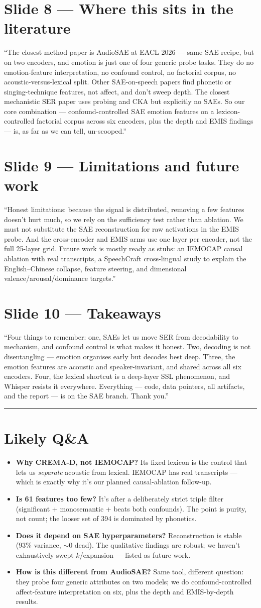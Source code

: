 \documentclass[11pt]{article}
\newcommand{\slide}[1]{\section{#1}}
\begin{document}
\slide{Slide 8 --- Where this sits in the literature}
``The closest method paper is AudioSAE at EACL 2026 --- same SAE recipe, but on two encoders, and emotion is just one of four generic probe tasks. They do no emotion-feature interpretation, no confound control, no factorial corpus, no acoustic-versus-lexical split. Other SAE-on-speech papers find phonetic or singing-technique features, not affect, and don't sweep depth. The closest mechanistic SER paper uses probing and CKA but explicitly no SAEs. So our core combination --- confound-controlled SAE emotion features on a lexicon-controlled factorial corpus across six encoders, plus the depth and EMIS findings --- is, as far as we can tell, un-scooped.''

\slide{Slide 9 --- Limitations and future work}
``Honest limitations: because the signal is distributed, removing a few features doesn't hurt much, so we rely on the sufficiency test rather than ablation. We must not substitute the SAE reconstruction for raw activations in the EMIS probe. And the cross-encoder and EMIS arms use one layer per encoder, not the full 25-layer grid. Future work is mostly ready as stubs: an IEMOCAP causal ablation with real transcripts, a SpeechCraft cross-lingual study to explain the English--Chinese collapse, feature steering, and dimensional valence/arousal/dominance targets.''

\slide{Slide 10 --- Takeaways}
``Four things to remember: one, SAEs let us move SER from decodability to mechanism, and confound control is what makes it honest. Two, decoding is not disentangling --- emotion organises early but decodes best deep. Three, the emotion features are acoustic and speaker-invariant, and shared across all six encoders. Four, the lexical shortcut is a deep-layer SSL phenomenon, and Whisper resists it everywhere. Everything --- code, data pointers, all artifacts, and the report --- is on the SAE branch. Thank you.''

\vspace{6pt}\hrule
\slide{Likely Q\&A}
\begin{itemize}
\item \textbf{Why CREMA-D, not IEMOCAP?} Its fixed lexicon is the control that lets us \emph{separate} acoustic from lexical. IEMOCAP has real transcripts --- which is exactly why it's our planned causal-ablation follow-up.
\item \textbf{Is 61 features too few?} It's after a deliberately strict triple filter (significant + monosemantic + beats both confounds). The point is purity, not count; the looser set of 394 is dominated by phonetics.
\item \textbf{Does it depend on SAE hyperparameters?} Reconstruction is stable (93\% variance, $\sim$0 dead). The qualitative findings are robust; we haven't exhaustively swept $k$/expansion --- listed as future work.
\item \textbf{How is this different from AudioSAE?} Same tool, different question: they probe four generic attributes on two models; we do confound-controlled affect-feature interpretation on six, plus the depth and EMIS-by-depth results.
\end{itemize}
\end{document}
